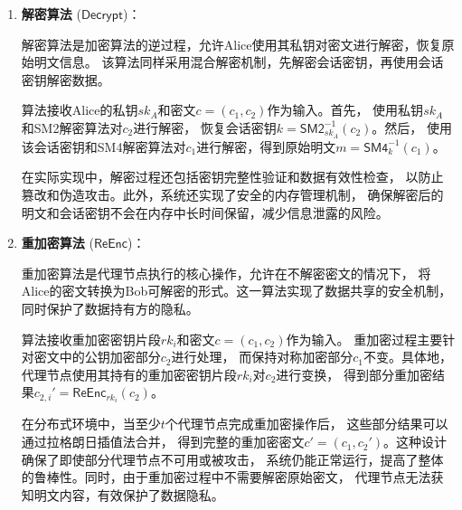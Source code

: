 \begin{enumerate}
	      具体实现中，算法首先随机生成一个会话密钥$k$，然后使用SM4对称加密算法和该密钥对明文$m$进行加密，
	      得到密文部分$c_1 = \mathsf{SM4}_k(m)$。SM4采用128位密钥长度和128位分组大小，
	      提供足够的安全强度。随后，使用SM3哈希算法实现密钥派生函数KDF，对会话密钥进行处理，
	      增强安全性。最后，使用Alice的公钥$pk_A$通过SM2算法对处理后的会话密钥进行加密，
	      得到密文的另一部分$c_2 = \mathsf{SM2}_{pk_A}(k)$。最终密文$c = (c_1, c_2)$包含这两部分组成。

	      这种混合加密方案充分利用了对称加密的高效性和公钥加密的安全密钥交换能力，
	      特别适合大量数据的加密处理。同时，通过引入随机会话密钥，即使对相同明文多次加密，
	      也会产生不同的密文，有效防止了统计分析攻击。

	\item \textbf{解密算法} ($\mathsf{Decrypt}$)：

	      解密算法是加密算法的逆过程，允许Alice使用其私钥对密文进行解密，恢复原始明文信息。
	      该算法同样采用混合解密机制，先解密会话密钥，再使用会话密钥解密数据。

	      算法接收Alice的私钥$sk_A$和密文$c = (c_1, c_2)$作为输入。首先，
	      使用私钥$sk_A$和SM2解密算法对$c_2$进行解密，
	      恢复会话密钥$k = \mathsf{SM2}_{sk_A}^{-1}(c_2)$。然后，
	      使用该会话密钥和SM4解密算法对$c_1$进行解密，得到原始明文$m = \mathsf{SM4}_k^{-1}(c_1)$。

	      在实际实现中，解密过程还包括密钥完整性验证和数据有效性检查，
	      以防止篡改和伪造攻击。此外，系统还实现了安全的内存管理机制，
	      确保解密后的明文和会话密钥不会在内存中长时间保留，减少信息泄露的风险。

	\item \textbf{重加密算法} ($\mathsf{ReEnc}$)：

	      重加密算法是代理节点执行的核心操作，允许在不解密密文的情况下，
	      将Alice的密文转换为Bob可解密的形式。这一算法实现了数据共享的安全机制，
	      同时保护了数据持有方的隐私。

	      算法接收重加密密钥片段$rk_i$和密文$c = (c_1, c_2)$作为输入。
	      重加密过程主要针对密文中的公钥加密部分$c_2$进行处理，
	      而保持对称加密部分$c_1$不变。具体地，
	      代理节点使用其持有的重加密密钥片段$rk_i$对$c_2$进行变换，
	      得到部分重加密结果$c_{2,i}' = \mathsf{ReEnc}_{rk_i}(c_2)$。

	      在分布式环境中，当至少$t$个代理节点完成重加密操作后，
	      这些部分结果可以通过拉格朗日插值法合并，
	      得到完整的重加密密文$c' = (c_1, c_2')$。这种设计确保了即使部分代理节点不可用或被攻击，
	      系统仍能正常运行，提高了整体的鲁棒性。同时，由于重加密过程中不需要解密原始密文，
	      代理节点无法获知明文内容，有效保护了数据隐私。


\end{enumerate}
